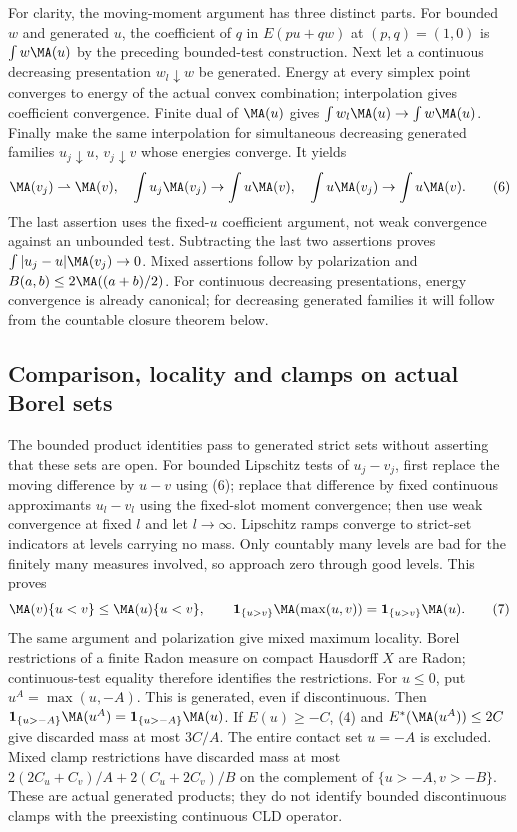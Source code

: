 For clarity, the moving-moment argument has three distinct parts.
For bounded $w$ and generated $u$, the coefficient of $q$ in
$E(pu+qw)$ at $(p,q)=(1,0)$ is $\int w\MA(u)$ by the preceding bounded-test
construction. Next let a continuous decreasing presentation $w_l\downarrow w$
be generated. Energy at every simplex point converges to energy of the
actual convex combination; interpolation gives coefficient convergence.
Finite dual of $\MA(u)$ gives $\int w_l\MA(u)\to\int w\MA(u)$.
Finally make the same interpolation for simultaneous decreasing generated
families $u_j\downarrow u$, $v_j\downarrow v$ whose energies converge.
It yields
\[
 \MA(v_j)\rightharpoonup\MA(v),\quad
 \int u_j\MA(v_j)\to\int u\MA(v),\quad
 \int u\MA(v_j)\to\int u\MA(v).                            \tag{6}
\]
The last assertion uses the fixed-$u$ coefficient argument, not weak convergence
against an unbounded test. Subtracting the last two assertions proves
$\int|u_j-u|\MA(v_j)\to0$. Mixed assertions follow by polarization and
$B(a,b)\le2\MA((a+b)/2)$. For continuous decreasing presentations, energy
convergence is already canonical; for decreasing generated families it will
follow from the countable closure theorem below.

\subsection{Comparison, locality and clamps on actual Borel sets}
The bounded product identities pass to generated strict sets without asserting
that these sets are open. For bounded Lipschitz tests of $u_j-v_j$, first
replace the moving difference by $u-v$ using (6); replace that difference by
fixed continuous approximants $u_l-v_l$ using the fixed-slot moment convergence;
then use weak convergence at fixed $l$ and let $l\to\infty$.
Lipschitz ramps converge to strict-set indicators at levels carrying no mass.
Only countably many levels are bad for the finitely many measures involved,
so approach zero through good levels. This proves
\[
 \MA(v)\{u<v\}\le\MA(u)\{u<v\},\qquad
 \mathbf1_{\{u>v\}}\MA(\max(u,v))
   =\mathbf1_{\{u>v\}}\MA(u).                              \tag{7}
\]
The same argument and polarization give mixed maximum locality.
Borel restrictions of a finite Radon measure on compact Hausdorff $X$ are
Radon; continuous-test equality therefore identifies the restrictions.
For $u\le0$, put $u^A=\max(u,-A)$. This is generated, even if discontinuous.
Then $\mathbf1_{\{u>-A\}}\MA(u^A)=\mathbf1_{\{u>-A\}}\MA(u)$.
If $E(u)\ge-C$, (4) and $E^*(\MA(u^A))\le2C$ give discarded mass
at most $3C/A$. The entire contact set $u=-A$ is excluded.
Mixed clamp restrictions have discarded mass at most
$2(2C_u+C_v)/A+2(C_u+2C_v)/B$ on the complement of
$\{u>-A,v>-B\}$. These are actual generated products; they do not identify
bounded discontinuous clamps with the preexisting continuous CLD operator.

